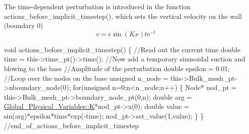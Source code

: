 The time-\/dependent perturbation is introduced in the function {\ttfamily actions\+\_\+before\+\_\+implicit\+\_\+timestep()}, which sets the vertical velocity on the wall (boundary 0) \[ v = \epsilon \sin(K x) t \mbox{e}^{-t} \] 
\begin{DoxyCodeInclude}
 \textcolor{keywordtype}{void} actions\_before\_implicit\_timestep()
  \{
   \textcolor{comment}{//Read out the current time}
   \textcolor{keywordtype}{double} time = this->time\_pt()->time();
   \textcolor{comment}{//Now add a temporary sinusoidal suction and blowing to the base}
   \textcolor{comment}{//Amplitude of the perturbation}
   \textcolor{keywordtype}{double} epsilon = 0.01;
   \textcolor{comment}{//Loop over the nodes on the base}
   \textcolor{keywordtype}{unsigned} n\_node = this->Bulk\_mesh\_pt->nboundary\_node(0);
   \textcolor{keywordflow}{for}(\textcolor{keywordtype}{unsigned} n=0;n<n\_node;n++)
    \{
     Node* nod\_pt = this->Bulk\_mesh\_pt->boundary\_node\_pt(0,n);
     \textcolor{keywordtype}{double} arg = \hyperlink{namespaceGlobal__Physical__Variables_a9da8be10d9e20eb0329af7fd8d6e0e98}{Global\_Physical\_Variables::K}*nod\_pt->x(0);
     \textcolor{keywordtype}{double} value = sin(arg)*epsilon*time*exp(-time);
     nod\_pt->set\_value(1,value);
    \}
  \} \textcolor{comment}{//end\_of\_actions\_before\_implicit\_timestep}

\end{DoxyCodeInclude}


